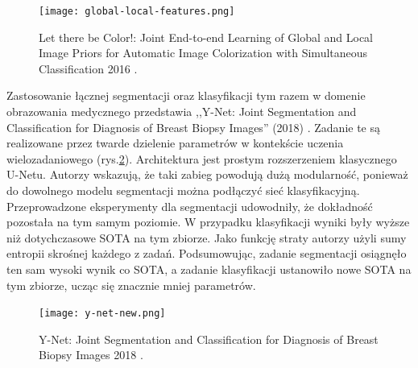 \begin{figure}[ht!]
    \texttt{[image: global-local-features.png]}
    \caption{Let there be Color!: Joint End-to-end Learning of Global and Local Image Priors for Automatic Image Colorization with Simultaneous Classification 2016 \cite{iizuka2016let}.}
    \label{fig:parrarel-arch}
\end{figure}
Zastosowanie łącznej segmentacji oraz klasyfikacji tym razem w domenie obrazowania medycznego przedstawia ,,Y-Net: Joint Segmentation and Classification for Diagnosis of Breast Biopsy Images'' (2018) \cite{mehta2018net}. Zadanie te są realizowane przez twarde dzielenie parametrów w kontekście uczenia wielozadaniowego (rys.\ref{fig:y-net}). Architektura jest prostym rozszerzeniem klasycznego U-Netu. Autorzy wskazują, że taki zabieg powodują dużą modularność, ponieważ do dowolnego modelu segmentacji można podłączyć sieć klasyfikacyjną. Przeprowadzone eksperymenty dla segmentacji udowodniły, że dokładność pozostała na tym samym poziomie. W przypadku klasyfikacji wyniki były wyższe niż dotychczasowe SOTA na tym zbiorze. Jako funkcję straty autorzy użyli sumy entropii skrośnej każdego z zadań. Podsumowując, zadanie segmentacji osiągnęło ten sam wysoki wynik co SOTA, a zadanie klasyfikacji ustanowiło nowe SOTA na tym zbiorze, ucząc się znacznie mniej parametrów.
\begin{figure}[ht!]
    \texttt{[image: y-net-new.png]}
    \caption{Y-Net: Joint Segmentation and Classification for Diagnosis of Breast Biopsy Images 2018 \cite{mehta2018net}.}
    \label{fig:y-net}
\end{figure}


